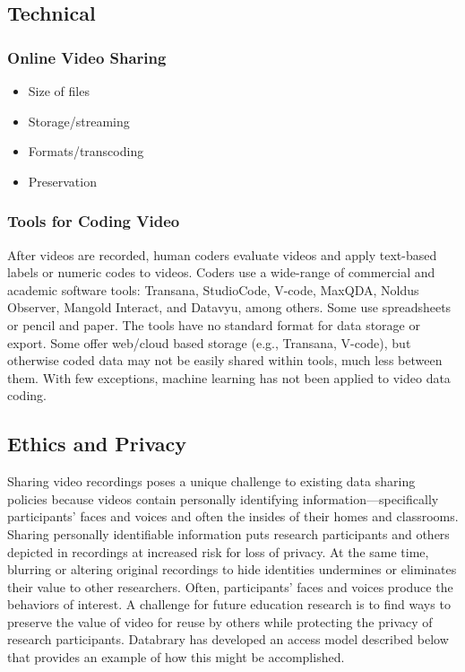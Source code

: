 \documentclass[letterpaper,man,natbib]{apa6}
\begin{document}
\subsection{Technical}

\subsubsection{Online Video Sharing}

\begin{itemize}
\item Size of files
\item Storage/streaming
\item Formats/transcoding
\item Preservation
\end{itemize}

\subsubsection{Tools for Coding Video}
After videos are recorded, human coders evaluate videos and apply text-based labels or numeric codes to videos.
Coders use a wide-range of commercial and academic software tools: Transana, StudioCode, V-code, MaxQDA, Noldus Observer, Mangold Interact, and Datavyu, among others.
Some use spreadsheets or pencil and paper.
The tools have no standard format for data storage or export.
Some offer web/cloud based storage (e.g., Transana, V-code), but otherwise coded data may not be easily shared within tools, much less between them.
With few exceptions, machine learning has not been applied to video data coding.
\subsection{Ethics and Privacy}
Sharing video recordings poses a unique challenge to existing data sharing policies because videos contain personally identifying information—specifically participants’ faces and voices and often the
insides of their homes and classrooms. 
Sharing personally identifiable information puts research participants and others depicted in recordings at increased risk for loss of privacy. 
At the same time, blurring or altering original recordings to hide identities undermines or eliminates
their value to other researchers. 
Often, participants’ faces and voices produce the behaviors of interest.
A challenge for future education research is to find ways to preserve the value of video for reuse by others while protecting the privacy of research participants.
Databrary has developed an access model described below that provides an example of how this might be accomplished.
\end{document}

